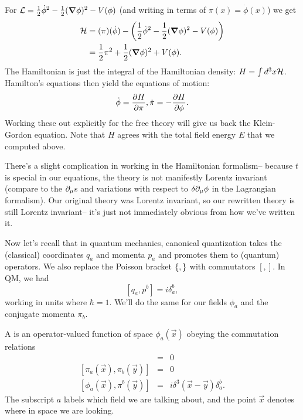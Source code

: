 \begin{exm}
For $\cL=\frac{1}{2}\dot \phi^2 -\frac{1}{2}(\grad \phi)^2 - V(\phi)$ (and writing in terms of $\pi(x)=\dot \phi(x)$) we get
\begin{align*}
\cH&=(\pi)(\dot \phi)-\left(\frac{1}{2}\dot \phi^2 -\frac{1}{2}(\grad \phi)^2 - V(\phi)\right)\\
&=\frac{1}{2}\pi^2 +\frac{1}{2}(\grad \phi)^2+ V(\phi).
\end{align*}
The Hamiltonian is just the integral of the Hamiltonian density: $H=\int d^3 x \cH$. Hamilton's equations then yield the equations of motion:
$$\dot \phi = \P{H}{\pi}, \dot \pi = -\P{H}{\phi}.$$
Working these out explicitly for the free theory will give us back the Klein-Gordon equation. Note that $H$ agrees with the total field energy $E$ that we computed above.
\end{exm}

There's a slight complication in working in the Hamiltonian formalism-- because $t$ is special in our equations, the theory is not manifestly Lorentz invariant (compare to the $\p_\mu$s and variations with respect to $\delta \p_\mu \phi$ in the Lagrangian formalism). Our original theory was Lorentz invariant, so our rewritten theory is still Lorentz invariant-- it's just not immediately obvious from how we've written it.

Now let's recall that in quantum mechanics, canonical quantization takes the (classical) coordinates $q_a$ and momenta $p_a$ and promotes them to (quantum) operators. We also replace the Poisson bracket $\set{,}$ with commutators $[,]$. In QM, we had
$$[q_a,p^b]= i \delta_a^b,$$
working in units where $\hbar=1$. We'll do the same for our fields $\phi_a$ and the conjugate momenta $\pi_b$.

\begin{defn}
A  is an operator-valued function of space $\phi_a(\vec x)$ obeying the commutation relations
\begin{eqnarray}
[\phi_a(\vec{x}),\phi_b(\vec{y})]&=&0 \\
{[\pi_a(\vec{x}),\pi_b (\vec{y})]} &=&0\\
{[\phi_a(\vec{x}),\pi^b (\vec{y})]}&=&i \delta^3(\vec{x}-\vec{y}) \delta_a^b.
\end{eqnarray}
The subscript $a$ labels which field we are talking about, and the point $\vec x$ denotes where in space we are looking.
\end{defn}

